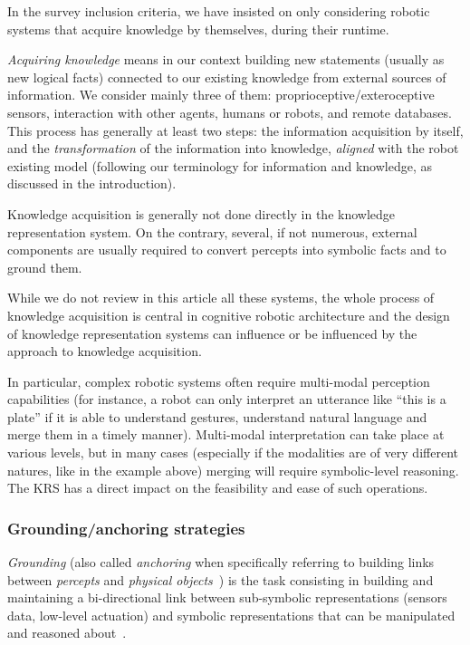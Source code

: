 In the survey inclusion criteria, we have insisted on only considering robotic
systems that acquire knowledge by themselves, during their runtime.

\emph{Acquiring knowledge} means in our context building new statements
(usually as new logical facts) connected to our existing knowledge from
external sources of information. We consider mainly three of them:
proprioceptive/exteroceptive sensors, interaction with other agents, humans or
robots, and remote databases. This process has generally at least two steps:
the information acquisition by itself, and the \emph{transformation} of the
information into knowledge, \emph{aligned} with the robot existing model
(following our terminology for information and knowledge, as discussed in the
introduction).

Knowledge acquisition is generally not done directly in the knowledge
representation system. On the contrary, several, if not numerous, external
components are usually required to convert percepts into symbolic facts and to
ground them.

While we do not review in this article all these systems, the whole process of
knowledge acquisition is central in cognitive robotic architecture and the
design of knowledge representation systems can influence or be influenced by
the approach to knowledge acquisition.

In particular, complex robotic systems often require multi-modal perception
capabilities (for instance, a robot can only interpret an utterance like ``this
is a plate'' if it is able to understand gestures, understand natural language
and merge them in a timely manner). Multi-modal interpretation can take place
at various levels, but in many cases (especially if the modalities are of very
different natures, like in the example above) merging will require
symbolic-level reasoning. The KRS has a direct impact on the feasibility and
ease of such operations.

\subsubsection{Grounding/anchoring strategies}
\label{sect|grounding}

\emph{Grounding} (also called \emph{anchoring} when specifically referring to
building links between \emph{percepts} and \emph{physical
objects}~\cite{Coradeschi2003}) is the task consisting in building and
maintaining a bi-directional link between sub-symbolic representations (sensors
data, low-level actuation) and symbolic representations that can be
manipulated and reasoned about~\cite{Harnad1990}.

